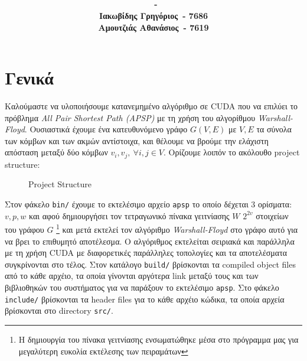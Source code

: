 \documentclass[11pt,a4paper,titlepage]{article}
\title{
	\vspace{5cm}
	\huge{\textbf{\hmwkClass}}\\
	\vspace{9pt}
	\LARGE{\hmwkTitle}\\
	\vspace{7cm}
}
\author{\textbf{\hmwkAuthorName\ - \hmwkAuthorAEM}
		\vspace{0.5em}\\
		\textbf{Ιακωβίδης Γρηγόριος\ - 7686}
		\vspace{0.5em}\\
		\textbf{Αμουτζιάς Αθανάσιος\ - 7619}}
\date{} %
\begin{document}
	
	\maketitle
	
	
	
	
	
	\section{Γενικά}
	Καλούμαστε να υλοποιήσουμε κατανεμημένο αλγόριθμο σε CUDA που να επιλύει το πρόβλημα \textit{All Pair Shortest Path (APSP)} με τη χρήση του αλγορίθμου \textit{Warshall-Floyd}. Ουσιαστικά έχουμε ένα κατευθυνόμενο γράφο $G(V, E)$ με $V, E$ τα σύνολα των κόμβων και των ακμών αντίστοιχα, και θέλουμε να βρούμε την ελάχιστη απόσταση μεταξύ δύο κόμβων $v_i, v_j,\ \forall i,j \in V$. Ορίζουμε λοιπόν το ακόλουθο project structure:\\
	
	\begin{wrapfigure}{r}{0.4\textwidth}
		\begin{minipage}[t]{0.4\textwidth}
		\end{minipage}
		\caption{Project Structure}			
	\end{wrapfigure}
	 
	Στον φάκελο \verb|bin/| έχουμε το εκτελέσιμο αρχείο \verb|apsp| το οποίο δέχεται 3 ορίσματα: $v, p, w$ και αφού δημιουργήσει τον τετραγωνικό πίνακα γειτνίασης $W$ $2^{2v}$ στοιχείων του γράφου $G$ \footnote{Η δημιουργία του πίνακα γειτνίασης ενσωματώθηκε μέσα στο πρόγραμμα μας για μεγαλύτερη ευκολία εκτέλεσης των πειραμάτων} και μετά εκτελεί τον αλγόριθμο \textit{Warshall-Floyd} στο γράφο αυτό για να βρει το επιθυμητό αποτέλεσμα. Ο αλγόριθμος εκτελείται σειριακά και παράλληλα με τη χρήση CUDA με διαφορετικές παράλληλες τοπολογίες και τα αποτελέσματα συγκρίνονται στο τέλος. Στον κατάλογο  \verb|build/| βρίσκονται τα compiled object files από το κάθε αρχέιο, τα οποία γίνονται αργότερα link μεταξύ τους και των βιβλιοθηκών του συστήματος για να παράξουν το εκτελέσιμο \verb|apsp|. Στο φάκελο \verb|include/| βρίσκονται τα header files για το κάθε αρχέιο κώδικα,  τα οποία αρχεία βρίσκονται στο directory \verb|src/|.\\
	
\end{document}
